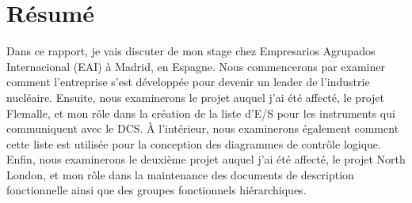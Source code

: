 \documentclass[11pt, openright]{book}
\begin{document}
\section*{Résumé}
Dans ce rapport, je vais discuter de mon stage chez Empresarios Agrupados Internacional (EAI) à Madrid, en Espagne. Nous commencerons par examiner comment l'entreprise s'est développée pour devenir un leader de l'industrie nucléaire. Ensuite, nous examinerons le projet auquel j'ai été affecté, le projet Flemalle, et mon rôle dans la création de la liste d'E/S pour les instruments qui communiquent avec le DCS. À l'intérieur, nous examinerons également comment cette liste est utilisée pour la conception des diagrammes de contrôle logique. Enfin, nous examinerons le deuxième projet auquel j'ai été affecté, le projet North London, et mon rôle dans la maintenance des documents de description fonctionnelle ainsi que des groupes fonctionnels hiérarchiques.

\vspace*{\fill}
\newpage
\thispagestyle{nohead}
\end{document}
